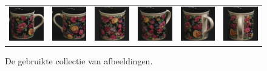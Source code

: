 \begin{figure}[p]
\begin{center}
\begin{tabular}{cccccc}
\includegraphics[width=2cm]{coil/beeld-60.eps} &
\includegraphics[width=2cm]{coil/beeld-61.eps} &
\includegraphics[width=2cm]{coil/beeld-62.eps} &
\includegraphics[width=2cm]{coil/beeld-63.eps} &
\includegraphics[width=2cm]{coil/beeld-64.eps} &
\includegraphics[width=2cm]{coil/beeld-65.eps} \\

\end{tabular}
\caption{\label{fig:testcollectie}De gebruikte collectie van afbeeldingen.}
\end{center}
\end{figure}

